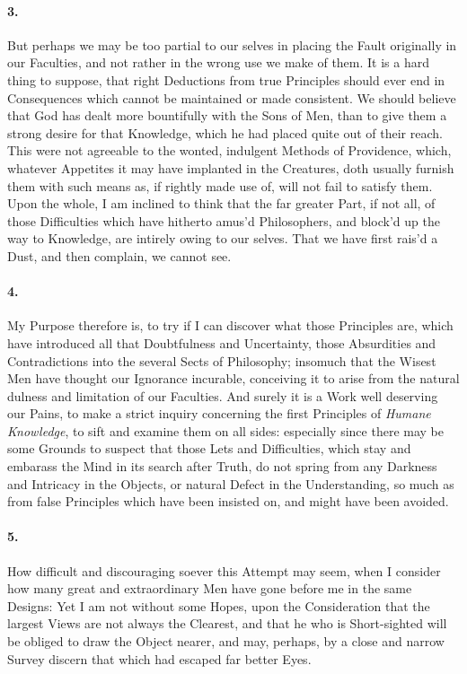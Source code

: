 \documentclass[]{article}
\newenvironment{sectionbody}{}{}
\begin{document}
\begin{sectionbody}
\paragraph{3.} But perhaps we may be too partial to our selves in placing the
Fault originally in our Faculties, and not rather in the wrong
use we make of them.  It is a hard thing to suppose, that right
Deductions from true Principles should ever end in Consequences
which cannot be maintained or made consistent.  We should believe
that God has dealt more bountifully with the Sons of Men, than to
give them a strong desire for that Knowledge, which he had placed
quite out of their reach.  This were not agreeable to the wonted,
indulgent Methods of Providence, which, whatever Appetites it may
have implanted in the Creatures, doth usually furnish them with
such means as, if rightly made use of, will not fail to satisfy
them.  Upon the whole, I am inclined to think that the far
greater Part, if not all, of those Difficulties which have
hitherto amus'd Philosophers, and block'd up the way to
Knowledge, are intirely owing to our selves.  That we have first
rais'd a Dust, and then complain, we cannot see.



\paragraph{4.} My Purpose therefore is, to try if I can discover what those
Principles are, which have introduced all that Doubtfulness and
Uncertainty, those Absurdities and Contradictions into the
several Sects of Philosophy; insomuch that the Wisest Men have
thought our Ignorance incurable, conceiving it to arise from the
natural dulness and limitation of our Faculties.  And surely it
is a Work well deserving our Pains, to make a strict inquiry
concerning the first Principles of \emph{Humane Knowledge}, to
sift and examine them on all sides: especially since there may be
some Grounds to suspect that those Lets and Difficulties, which
stay and embarass the Mind in its search after Truth, do not
spring from any Darkness and Intricacy in the Objects, or natural
Defect in the Understanding, so much as from false Principles
which have been insisted on, and might have been avoided.



\paragraph{5.} How difficult and discouraging soever this Attempt may seem, when
I consider how many great and extraordinary Men have gone before
me in the same Designs: Yet I am not without some Hopes, upon the
Consideration that the largest Views are not always the Clearest,
and that he who is Short-sighted will be obliged to draw the
Object nearer, and may, perhaps, by a close and narrow Survey
discern that which had escaped far better Eyes.




\end{sectionbody}
\end{document}
